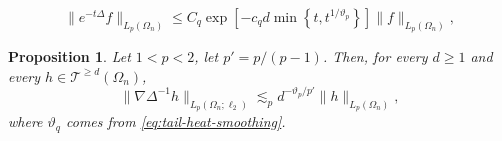 \documentclass[10pt,a4paper]{amsart}
\newtheorem{prop}{Proposition}
\begin{document}
\begin{equation}\label{eq:tail-heat-smoothing}
 \|e^{-t\Delta}f\|_{L_{p}(\Omega_{n})}\le C_q\exp\!\left[-c_qd\min\left\{t,t^{1/\vartheta_p}\right\}\right]\|f\|_{L_{p}(\Omega_{n})},
\end{equation}

\begin{prop}
\label{prop:tail-gradient-potential}
Let $1<p<2$, let $p'=p/(p-1)$.  Then, for every $d\ge1$ and every
$h\in \mathcal{T}^{\geq d}(\Omega_{n})$,
\begin{equation}\label{eq:tail-gradient-potential}
 \|\nabla\Delta^{-1}h\|_{L_p(\Omega_n;\ell_2)}
 \lesssim_p
 d^{-\vartheta_p/p'}
 \|h\|_{L_p(\Omega_n)},
\end{equation}
where $\vartheta_q$ comes from \eqref{eq:tail-heat-smoothing}.
\end{prop}
\end{document}

